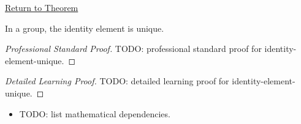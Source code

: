 \newpage
{}
\label{prf:identity-element-unique}

\begin{remark*}[Return]
\hyperref[prop:identity-element-unique]{Return to Theorem}
\end{remark*}

\begin{proposition*}
In a group, the identity element is unique.
\end{proposition*}

\begin{proof}[Professional Standard Proof]
\LRAProofBodyStart
TODO: professional standard proof for identity-element-unique.
\end{proof}

\begin{proof}[Detailed Learning Proof]
\LRAProofBodyStart
TODO: detailed learning proof for identity-element-unique.
\end{proof}

\begin{remark*}
\end{remark*}

\begin{dependencies}
\begin{itemize}
  \item TODO: list mathematical dependencies.
\end{itemize}
\end{dependencies}

\clearpage
